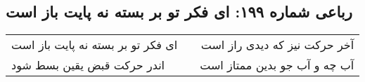 \begin{center}
\section*{رباعی شماره ۱۹۹: ای فکر تو بر بسته نه پایت باز است}
\label{sec:0199}
\begin{longtable}{l p{0.5cm} r}
ای فکر تو بر بسته نه پایت باز است
&&
آخر حرکت نیز که دیدی راز است
\\
اندر حرکت قبض یقین بسط شود
&&
آب چه و آب جو بدین ممتاز است
\\
\end{longtable}
\end{center}
